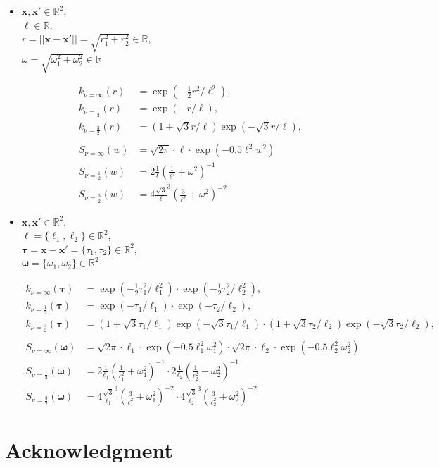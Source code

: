 \documentclass[]{interact}
\theoremstyle{plain}%
\theoremstyle{definition}
\theoremstyle{remark}
\begin{document}
\begin{itemize}
\item
$\mathbf{x}, \mathbf{x}' \in \mathbb{R}^2$,\\ 
$\ell \in \mathbb{R}$, \\
$r=||\mathbf{x}-\mathbf{x}'||=\sqrt{r_1^2+r_2^2}\in \mathbb{R}$, \\
$\omega=\sqrt{\omega_1^2+\omega_2^2}\in \mathbb{R}$

%
\begin{align*}
k_{\nu=\infty}(r)&=\exp(-\frac{1}{2} r^2/\ell^2), \\
k_{\nu=\frac{1}{2}}(r)&=\exp(-r/\ell), \\
k_{\nu=\frac{3}{2}}(r)&=(1+\sqrt{3}r/\ell) \exp(-\sqrt{3}r/\ell),    \\
\\
S_{\nu=\infty}(w)&=  \sqrt{2\pi} \cdot \ell \cdot \exp\left(-0.5 \ell^2 w^2\right) \\
S_{\nu=\frac{1}{2}}(w)&= 2 \frac{1}{\ell}\left(\frac{1}{\ell^2} + \omega^2\right)^{-1} \\
S_{\nu=\frac{3}{2}}(w)&= 4 \frac{\sqrt{3}}{\ell}^{3}\left(\frac{3}{\ell^2} + \omega^2\right)^{-2}
\end{align*}


\item 
$\mathbf{x}, \mathbf{x}' \in \mathbb{R}^2$, \\
$\bm{\ell}=\{\ell_1,\ell_2\} \in \mathbb{R}^2$, \\
$\bm{\tau}=\mathbf{x}- \mathbf{x}'=\{\tau_1,\tau_2\}\in \mathbb{R}^2$, \\
$\bm{\omega}=\{\omega_1,\omega_2\}\in \mathbb{R}^2$

%
\begin{align*}
k_{\nu=\infty}(\bm{\tau})&=\exp(-\frac{1}{2} \tau_1^2/\ell_1^2) \cdot \exp(-\frac{1}{2} \tau_2^2/\ell_2^2), \\
k_{\nu=\frac{1}{2}}(\bm{\tau})&=\exp(-\tau_1/\ell_1) \cdot \exp(-\tau_2/\ell_2), \\
k_{\nu=\frac{3}{2}}(\bm{\tau})&=(1+\sqrt{3}\tau_1/\ell_1) \exp(-\sqrt{3}\tau_1/\ell_1) \cdot (1+\sqrt{3}\tau_2/\ell_2) \exp(-\sqrt{3}\tau_2/\ell_2),  \\
\\
S_{\nu=\infty}(\bm{\omega})&= \sqrt{2\pi} \cdot \ell_1 \cdot \exp\left(-0.5 \ell_1^2 \omega_1^2\right) \cdot  \sqrt{2\pi} \cdot \ell_2 \cdot \exp\left(-0.5 \ell_2^2 \omega_2^2\right) \\
S_{\nu=\frac{1}{2}}(\bm{\omega})&= 2 \frac{1}{\ell_1}\left(\frac{1}{\ell_1^2} + \omega_1^2\right)^{-1} \cdot 2 \frac{1}{\ell_2}\left(\frac{1}{\ell_2^2} + \omega_2^2\right)^{-1} \\
S_{\nu=\frac{3}{2}}(\bm{\omega})&= 4 \frac{\sqrt{3}}{\ell_1}^{3}\left(\frac{3}{\ell_1^2} + \omega_1^2\right)^{-2} \cdot 4 \frac{\sqrt{3}}{\ell_2}^{3}\left(\frac{3}{\ell_2^2} + \omega_2^2\right)^{-2}
\end{align*}

\end{itemize}

\newpage
\vspace{2mm}
\section*{Acknowledgment}



\end{document}
